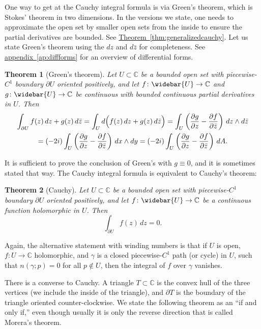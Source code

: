\documentclass[12pt,openany]{book}
\newcommand{\C}{{\mathbb{C}}}
\theoremstyle{plain}
\newtheorem{thm}{Theorem}[section]
\theoremstyle{remark}
\theoremstyle{definition}
\theoremstyle{exercise}
\theoremstyle{example}
\newcommand{\appendixref}[1]{\hyperref[#1]{appendix~\ref*{#1}}}
\newcommand{\thmref}[1]{\hyperref[#1]{Theorem~\ref*{#1}}}
\begin{document}
One way to get at the Cauchy integral formula is via Green's theorem,
which is Stokes' theorem
in two dimensions.  In the versions we state, one needs to
approximate the open set by smaller open sets from the inside to ensure
the partial derivatives are bounded.  See
\thmref{thm:generalizedcauchy}.  Let us state Green's theorem using
the $dz$ and $d\bar{z}$ for completeness.  See \appendixref{ap:diffforms}
for an overview of differential forms.

\begin{thm}[Green's theorem] \label{thm:greens}
Let $U \subset \C$ be a bounded open set with piecewise-$C^1$ boundary
$\partial U$ oriented positively, and let
$f \colon \widebar{U} \to \C$ and 
$g \colon \widebar{U} \to \C$
be continuous
with bounded continuous partial derivatives in $U$.
Then
\begin{multline*}
\int_{\partial U} f(z) \, dz + g(z) \, d\bar{z}
=
\int_{U} d \Bigl( f(z) \, dz + g(z) \, d\bar{z} \Bigr)
=
\int_{U}
\left(
\frac{\partial g}{\partial z}
-
\frac{\partial f}{\partial \bar{z}}
\right)
\, dz \wedge d\bar{z}
\\
=
(-2i)
\int_{U}
\left(
\frac{\partial g}{\partial z}
-
\frac{\partial f}{\partial \bar{z}}
\right)
\, dx \wedge dy
=
(-2i)
\int_{U}
\left(
\frac{\partial g}{\partial z}
-
\frac{\partial f}{\partial \bar{z}}
\right)
\, dA.
\end{multline*}
\end{thm}

It is sufficient to prove the conclusion of Green's
with $g\equiv 0$, and it is sometimes stated that way.
The Cauchy integral formula is equivalent to
Cauchy's theorem:

\begin{thm}[Cauchy]
Let $U \subset \C$ be a bounded open set with piecewise-$C^1$ boundary
$\partial U$ oriented positively, and let
$f \colon \widebar{U} \to \C$ be a continuous function
holomorphic in $U$.  Then
\begin{equation*}
\int_{\partial U}
f(z) \, dz = 0 .
\end{equation*}
\end{thm}

Again, the alternative statement with winding numbers
 is that if $U$ is open, $f \colon U \to \C$ holomorphic, and $\gamma$ is
a closed piecewise-$C^1$ path (or cycle) in $U$, such that
$n(\gamma;p) = 0$ for all $p \notin U$, then
the integral of $f$ over $\gamma$ vanishes.

There is a converse to Cauchy.  A triangle $T \subset \C$ is
the convex hull of the three vertices (we include the inside of the
triangle), and $\partial T$ is the boundary of the triangle oriented
counter-clockwise.  We state the following theorem as an
``if and only if,'' even though usually it is only the reverse direction that
is called Morera's theorem.
\end{document}
